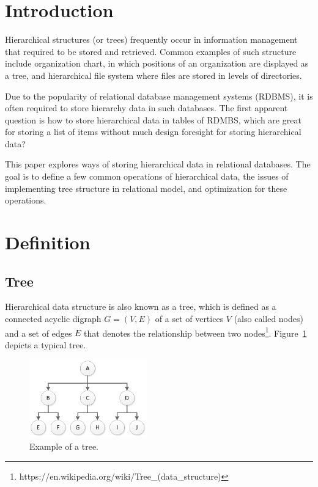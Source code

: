 \section{Introduction}\label{section-introduction}


Hierarchical structures (or trees) frequently occur in information management that required to be stored and retrieved. Common examples of such structure include organization chart, in which positions of an organization are displayed as a tree, and hierarchical file system where files are stored in levels of directories.

Due to the popularity of relational database management systems (RDBMS), it is often required to store hierarchy data in such databases. The first apparent question is how to store hierarchical data in tables of RDMBS, which are great for storing a list of items without much design foresight for storing hierarchical data?

This paper explores ways of storing hierarchical data in relational databases. The goal is to define a few common operations of hierarchical data, the issues of implementing tree structure in relational model, and optimization for these operations.

\section{Definition}\label{section-definition}

\subsection{Tree}\label{section-tree}

Hierarchical data structure is also known as a tree, which is defined as a connected acyclic digraph $G=(V,E)$ of a set of vertices $V$ (also called nodes) and a set of edges $E$ that denotes the relationship between two nodes\footnote{https://en.wikipedia.org/wiki/Tree\_(data\_structure)}. Figure~\ref{fig:tree} depicts a typical tree.

\begin{figure}[h]
\begin{center}
\includegraphics[width=2in]{images/tree.eps}
\caption{Example of a tree.\label{fig:tree}}
\end{center}
\end{figure}

